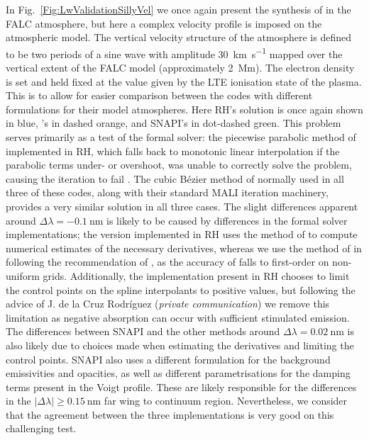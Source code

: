 In Fig.~\ref{Fig:LwValidationSillyVel} we once again present the synthesis of \CaLine{} in the FALC atmosphere, but here a complex velocity profile is imposed on the atmospheric model.
The vertical velocity structure of the atmosphere is defined to be two periods of a sine wave with amplitude \SI{30}{\kilo\metre\per\second} mapped over the vertical extent of the FALC model (approximately \SI{2}{\mega\metre}).
The electron density is set and held fixed at the value given by the LTE ionisation state of the plasma.
This is to allow for easier comparison between the codes with different formulations for their model atmospheres.
Here RH's solution is once again shown in blue, \Lw{}'s in dashed orange, and SNAPI's in dot-dashed green.
This problem serves primarily as a test of the formal solver: the piecewise parabolic method of \citet{Auer1994} implemented in RH, which falls back to monotonic linear interpolation if the parabolic terms under- or overshoot, was unable to correctly solve the problem, causing the iteration to fail .
The cubic Bézier method of \citet{DelaCruzRodriguez2013} normally used in all three of these codes, along with their standard MALI iteration machinery, provides a very similar solution in all three cases.
The slight differences apparent around $\Delta\lambda=\SI{-0.1}{\nano\metre}$ is likely to be caused by differences in the formal solver implementations; the version implemented in RH uses the method of \citet{Fritsch1984} to compute numerical estimates of the necessary derivatives, whereas we use the method of \citet{Steffen1990} in \Lw{} following the recommendation of \citet{Janett2018}, as the accuracy of \citet{Fritsch1984} falls to first-order on non-uniform grids.
Additionally, the implementation present in RH chooses to limit the control points on the spline interpolants to positive values, but following the advice of J. de la Cruz Rodríguez (\emph{private communication}) we remove this limitation as negative absorption can occur with sufficient stimulated emission.
The differences between SNAPI and the other methods around $\Delta\lambda=\SI{0.02}{\nano\metre}$ is also likely due to choices made when estimating the derivatives and limiting the control points.
SNAPI also uses a different formulation for the background emissivities and opacities, as well as different parametrisations for the damping terms present in the Voigt profile.
These are likely responsible for the differences in the $|\Delta\lambda| \geq \SI{0.15}{\nano\metre}$ far wing to continuum region.
Nevertheless, we consider that the agreement between the three implementations is very good on this challenging test.

